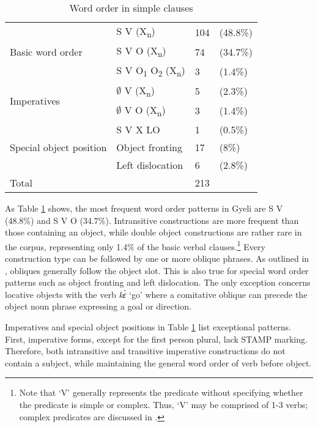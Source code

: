 \begin{table}[!h]
\centering
\begin{tabular}{l|lll}
 \midrule
\multirow{3}{*}{Basic word order} & S V (X\textsubscript{n}) & 104 & (48.8\%) \\
& S V O (X\textsubscript{n}) & 74 & (34.7\%)\\
& S V O\textsubscript{1} O\textsubscript{2} (X\textsubscript{n}) & 3 & (1.4\%) \\
 \midrule 
\multirow{2}{*}{Imperatives} &  $\emptyset$ V (X\textsubscript{n}) & 5 & (2.3\%) \\
 & $\emptyset$ V O (X\textsubscript{n}) & 3 & (1.4\%)  \\ 
 \midrule
\multirow{3}{*}{Special object position}  & S V X LO & 1 & (0.5\%) \\
 & Object fronting & 17 & (8\%)  \\
 & Left dislocation & 6  & (2.8\%) \\
 \midrule
Total & &  213 \\
 \midrule
\end{tabular}
\caption{Word order in simple clauses}
\label{Tab:BCT}
\end{table}

As Table \ref{Tab:BCT} shows, the most frequent word order patterns in Gyeli are S V (48.8\%) and S V O (34.7\%). Intransitive constructions are more frequent than those containing an object, while double object constructions are rather rare in the corpus, representing only 1.4\% of the basic verbal clauses.\footnote{Note that `V' generally represents the predicate without specifying whether the predicate is simple or complex. Thus, `V' may be comprised of 1-3 verbs; complex predicates are discussed in .} Every construction type can be followed by one or more oblique phrases.  As outlined in , obliques generally follow the object slot. This is also true for special word order patterns such as object fronting and left dislocation. The only exception concerns locative objects with the verb {\itshape kɛ̀} `go' where a comitative oblique can precede the object noun phrase expressing a goal or direction.

Imperatives and special object positions in Table \ref{Tab:BCT} list exceptional patterns. First, imperative forms, except for the first person plural, lack STAMP marking. Therefore, both intransitive and transitive imperative constructions do not contain a subject, while maintaining the general word order of verb before object.

